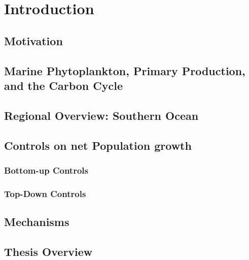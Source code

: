 
\chapter{Introduction}
\label{chap:1}
\raggedbottom

\clearpage

\section{Motivation}

\section{Marine Phytoplankton, Primary Production, and the Carbon Cycle}

\section{Regional Overview: Southern Ocean}

\section{Controls on net Population growth}

\subsection{Bottom-up Controls}

\subsection{Top-Down Controls}

\section{Mechanisms}

\section{Thesis Overview}
